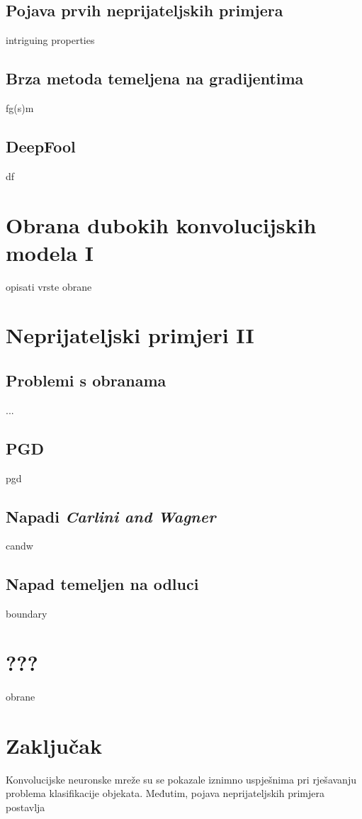 \documentclass[utf8, diplomski]{fer}
\begin{document}
\section{Pojava prvih neprijateljskih primjera}
intriguing properties\citep{Szegedy2014IntriguingPO}
\section{Brza metoda temeljena na gradijentima}
fg(s)m\citep{Goodfellow2015ExplainingAH}
\section{DeepFool} df\citep{MoosaviDezfooli2016DeepFoolAS}


\chapter{Obrana dubokih konvolucijskih modela I}
opisati vrste obrane \\

\chapter{Neprijateljski primjeri II}
\section{Problemi s obranama} ...
\section{PGD} pgd\citep{Madry2017TowardsDL}
\section{Napadi \textit{Carlini and Wagner}} candw\citep{Carlini2017TowardsET}
\section{Napad temeljen na odluci} boundary\citep{Brendel2017DecisionBasedAA}

\chapter{???}
obrane

\chapter{Zaključak}
Konvolucijske neuronske mreže su se pokazale iznimno uspješnima pri rješavanju problema klasifikacije objekata. Međutim, pojava neprijateljskih primjera postavlja 
\end{document}

